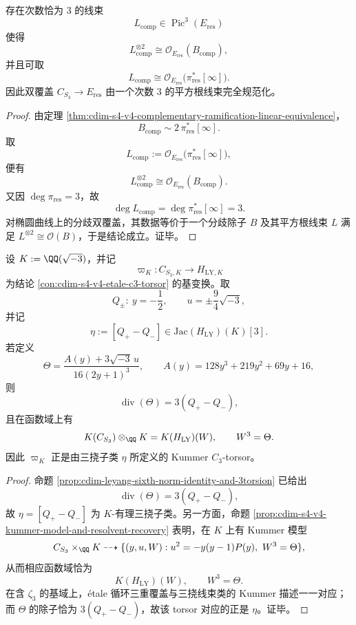 \begin{corollary}\label{cor:cdim-s4-v4-complementary-branch-square-root-line-bundle}
存在次数恰为 \(3\) 的线束
\[
L_{\mathrm{comp}}\in \operatorname{Pic}^3(E_{\mathrm{res}})
\]
使得
\[
L_{\mathrm{comp}}^{\otimes 2}\cong \mathcal O_{E_{\mathrm{res}}}(B_{\mathrm{comp}}),
\]
并且可取
\[
L_{\mathrm{comp}}\cong \mathcal O_{E_{\mathrm{res}}}\!\bigl(\pi_{\mathrm{res}}^*[\infty]\bigr).
\]
因此双覆盖 \(C_{S_3}\to E_{\mathrm{res}}\) 由一个次数 \(3\) 的平方根线束完全规范化。
\end{corollary}
\begin{proof}
由定理 \ref{thm:cdim-s4-v4-complementary-ramification-linear-equivalence}，
\[
B_{\mathrm{comp}}\sim 2\,\pi_{\mathrm{res}}^*[\infty].
\]
取
\[
L_{\mathrm{comp}}:=\mathcal O_{E_{\mathrm{res}}}\!\bigl(\pi_{\mathrm{res}}^*[\infty]\bigr),
\]
便有
\[
L_{\mathrm{comp}}^{\otimes 2}\cong \mathcal O_{E_{\mathrm{res}}}(B_{\mathrm{comp}}).
\]
又因 \(\deg\pi_{\mathrm{res}}=3\)，故
\[
\deg L_{\mathrm{comp}}=\deg \pi_{\mathrm{res}}^*[\infty]=3.
\]
对椭圆曲线上的分歧双覆盖，其数据等价于一个分歧除子 \(B\) 及其平方根线束 \(L\) 满足 \(L^{\otimes 2}\cong\mathcal O(B)\)，于是结论成立。证毕。
\end{proof}

\begin{theorem}\label{thm:cdim-s4-v4-kummer-torsor-generated-by-explicit-3torsion}
设 \(K:=\QQ(\sqrt{-3})\)，并记
\[
\varpi_K:C_{S_3,K}\longrightarrow H_{\mathrm{LY},K}
\]
为结论 \ref{con:cdim-s4-v4-etale-c3-torsor} 的基变换。取
\[
Q_\pm:\ y=-\frac12,\qquad u=\pm \frac94\sqrt{-3},
\]
并记
\[
\eta:=[Q_+-Q_-]\in \mathrm{Jac}(H_{\mathrm{LY}})(K)[3].
\]
若定义
\[
\Theta=
\frac{A(y)+3\sqrt{-3}\,u}{16(2y+1)^3},
\qquad
A(y)=128y^3+219y^2+69y+16,
\]
则
\[
\operatorname{div}(\Theta)=3(Q_+-Q_-),
\]
且在函数域上有
\[
K(C_{S_3})\otimes_{\QQ}K
=
K(H_{\mathrm{LY}})(W),
\qquad
W^3=\Theta.
\]
因此 \(\varpi_K\) 正是由三挠子类 \(\eta\) 所定义的 Kummer \(C_3\)-torsor。
\end{theorem}
\begin{proof}
命题 \ref{prop:cdim-leyang-sixth-norm-identity-and-3torsion} 已给出
\[
\operatorname{div}(\Theta)=3(Q_+-Q_-),
\]
故 \(\eta=[Q_+-Q_-]\) 为 \(K\)-有理三挠子类。另一方面，命题 \ref{prop:cdim-s4-v4-kummer-model-and-resolvent-recovery} 表明，在 \(K\) 上有 Kummer 模型
\[
C_{S_3}\times_{\QQ}K \dashrightarrow \{(y,u,W):u^2=-y(y-1)P(y),\ W^3=\Theta\},
\]
从而相应函数域恰为
\[
K(H_{\mathrm{LY}})(W),\qquad W^3=\Theta.
\]
在含 \(\zeta_3\) 的基域上，étale 循环三重覆盖与三挠线束类的 Kummer 描述一一对应；而 \(\Theta\) 的除子恰为 \(3(Q_+-Q_-)\)，故该 torsor 对应的正是 \(\eta\)。证毕。
\end{proof}

